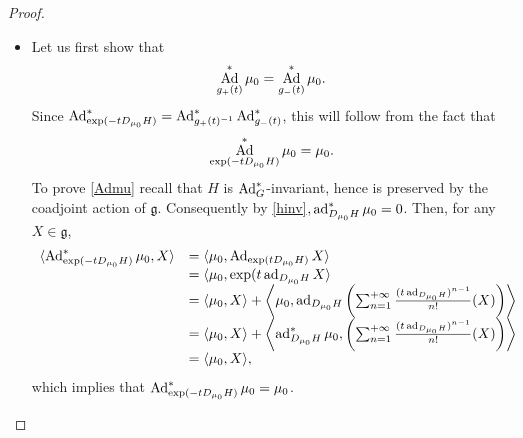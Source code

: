 \documentclass[a4paper,12pt,reqno]{amsart}%
\theoremstyle{definition}
\theoremstyle{remark}
\numberwithin{theorem}{section}
\numberwithin{equation}{section}
\newcommand{\1}{{\bf 1}}
\DeclareMathOperator{\ad}{\textnormal{ad}}
\DeclareMathOperator{\Ad}{\textnormal{Ad}}
\newcommand{\g}{{\mathfrak g}}
\begin{document}
\begin{proof}${}$

    \begin{itemize}
        \item 
    Let us first show that \[\Ad^*_{g_+(t)}\mu_0 = \Ad^*_{g_-(t)}\mu_0.\]  Since $\Ad^*_{\exp(-t D_{\mu_0}H)} = \Ad^*_{g_+(t)^{-1}} \Ad^*_{g_-(t)}$, this will follow from the fact that 
    \begin{equation}\label{Admu}
    \Ad^*_{\exp(-t D_{\mu_0}H)}\mu_0 = \mu_0.
    \end{equation}
    To prove \eqref{Admu} recall that $H$ is $\Ad^*_G$-invariant, hence
    is preserved by the coadjoint action of $\g$. Consequently  by \eqref{hinv}$, \ad^*_{D_{\mu_0}H}\mu_0 = 0$. Then, for any $X\in\g$,
    \[
    \begin{array}{ll}
    \langle \Ad^*_{\exp(-t D_{\mu_0}H)}\mu_0, X\rangle & = \langle \mu_0, \Ad_{\exp(t D_{\mu_0}H)}X \rangle\\
    & =  \langle \mu_0, \exp(t \ad_{D_{\mu_0}H}X \rangle\\
    & =  \langle \mu_0, X\rangle + \left\langle \mu_0, \ad_{D_{\mu_0}H}\left(\sum_{n = 1}^{+\infty} \frac{(t \ad_{D_{\mu_0}H})^{n-1}}{n!}(X)\right)\right\rangle\\
    & = \langle \mu_0, X\rangle + \left\langle \ad^*_{D_{\mu_0}H}\mu_0, \left(\sum_{n = 1}^{+\infty} \frac{(t \ad_{D_{\mu_0}H})^{n-1}}{n!}(X)\right)\right\rangle\\ & = \langle \mu_0, X\rangle,
    \end{array}
    \]
    which implies that $\Ad^*_{\exp(-t D_{\mu_0}H)}\mu_0 = \mu_0$. 
    

\end{itemize}
\end{proof}
\end{document}

